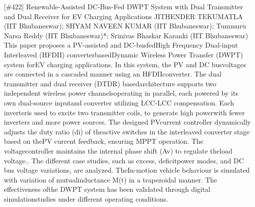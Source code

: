{} \begin{abstract_online} {[\#422] Renewable-Assisted DC-Bus-Fed DWPT System with Dual Transmitter and Dual Receiver for EV Charging Applications} {} { JITHENDER  TEKUMATLA (IIT Bhubaneswar);  SHYAM  NAVEEN KUMAR (IIT Bhubaneswar); Tummuru Narsa Reddy (IIT Bhubaneswar)*; Srinivas Bhaskar Karanki (IIT Bhubaneswar)} {} This paper proposes a PV-assisted and DC-busfedHigh Frequency Dual-input Interleaved (HFDII) converterbasedDynamic Wireless Power Transfer (DWPT) system forEV charging applications. In this system, the PV and DC busvoltages are connected in a cascaded manner using an HFDIIconverter. The dual transmitter and dual receiver (DTDR) basedarchitecture supports two independent wireless power channelsoperating in parallel, each powered by its own dual-source inputand converter utilizing LCC-LCC compensation. Each inverteris used to excite two transmitter coils, to generate high powerwith fewer inverters and more power sources. The designed PVcurrent controller dynamically adjusts the duty ratio (di) of theactive switches in the interleaved converter stage based on thePV current feedback, ensuring MPPT operation. The voltagecontroller maintains the internal phase shift (Av) to regulate theload voltage.. The different case studies, such as excess, deficitpower modes, and DC bus voltage variations, are analyzed. TheIn-motion vehicle behaviour is simulated with variation of mutualinductance M(t) in a trapezoidal manner. The effectiveness ofthe DWPT system has been validated through digital simulationstudies under different operating conditions. \end{abstract_online} 
